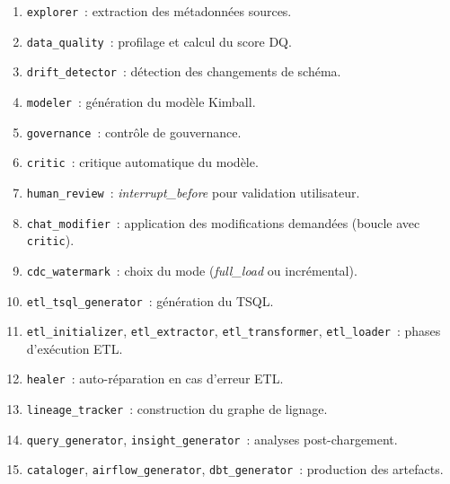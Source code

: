 \documentclass[12pt, a4paper]{report}
\begin{document}
\begin{enumerate}
  \item \texttt{explorer}~: extraction des métadonnées sources.
  \item \texttt{data\_quality}~: profilage et calcul du score \ac{DQ}.
  \item \texttt{drift\_detector}~: détection des changements de schéma.
  \item \texttt{modeler}~: génération du modèle Kimball.
  \item \texttt{governance}~: contrôle de gouvernance.
  \item \texttt{critic}~: critique automatique du modèle.
  \item \texttt{human\_review}~: \emph{interrupt\_before} pour
        validation utilisateur.
  \item \texttt{chat\_modifier}~: application des modifications
        demandées (boucle avec \texttt{critic}).
  \item \texttt{cdc\_watermark}~: choix du mode (\emph{full\_load} ou
        incrémental).
  \item \texttt{etl\_tsql\_generator}~: génération du \ac{TSQL}.
  \item \texttt{etl\_initializer}, \texttt{etl\_extractor},
        \texttt{etl\_transformer}, \texttt{etl\_loader}~: phases
        d'exécution ETL.
  \item \texttt{healer}~: auto-réparation en cas d'erreur ETL.
  \item \texttt{lineage\_tracker}~: construction du graphe de lignage.
  \item \texttt{query\_generator}, \texttt{insight\_generator}~:
        analyses post-chargement.
  \item \texttt{cataloger}, \texttt{airflow\_generator},
        \texttt{dbt\_generator}~: production des artefacts.
\end{enumerate}
\end{document}
